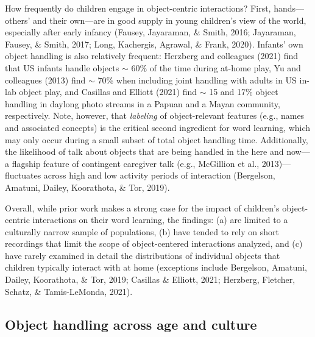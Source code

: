 \documentclass[10pt, letterpaper]{article}
\begin{document}
How frequently do children engage in object-centric interactions? First,
hands---others' and their own---are in good supply in young children's
view of the world, especially after early infancy (Fausey, Jayaraman, \&
Smith, 2016; Jayaraman, Fausey, \& Smith, 2017; Long, Kachergis,
Agrawal, \& Frank, 2020). Infants' own object handling is also
relatively frequent: Herzberg and colleagues (2021) find that US infants
handle objects \(\sim\) 60\% of the time during at-home play, Yu and
colleagues (2013) find \(\sim\) 70\% when including joint handling with
adults in US in-lab object play, and Casillas and Elliott (2021) find
\(\sim\) 15 and 17\% object handling in daylong photo streams in a
Papuan and a Mayan community, respectively. Note, however, that
\emph{labeling} of object-relevant features (e.g., names and associated
concepts) is the critical second ingredient for word learning, which may
only occur during a small subset of total object handling time.
Additionally, the likelihood of talk about objects that are being
handled in the here and now---a flagship feature of contingent caregiver
talk (e.g., McGillion et al., 2013)---fluctuates across high and low
activity periods of interaction (Bergelson, Amatuni, Dailey, Koorathota,
\& Tor, 2019).

Overall, while prior work makes a strong case for the impact of
children's object-centric interactions on their word learning, the
findings: (a) are limited to a culturally narrow sample of populations,
(b) have tended to rely on short recordings that limit the scope of
object-centered interactions analyzed, and (c) have rarely examined in
detail the distributions of individual objects that children typically
interact with at home (exceptions include Bergelson, Amatuni, Dailey,
Koorathota, \& Tor, 2019; Casillas \& Elliott, 2021; Herzberg, Fletcher,
Schatz, \& Tamis-LeMonda, 2021).

\hypertarget{object-handling-across-age-and-culture}{%
\subsection{Object handling across age and
culture}\label{object-handling-across-age-and-culture}}
\end{document}
